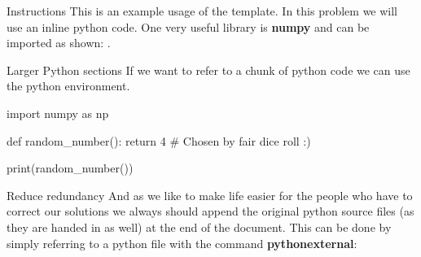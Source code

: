 \documentclass{dfki_ml}
\begin{document}
\begin{problem}{Instructions}
This is an example usage of the template. In this problem
we will use an inline python code. One very useful library
is \textbf{numpy} and can be imported as shown: .
\end{problem}


\begin{problem}{Larger Python sections}
If we want to refer to a chunk of python code we can use the python
environment.
\begin{python}
import numpy as np

def random_number():
    return 4 # Chosen by fair dice roll :)
    
print(random_number())
\end{python}
\end{problem}

\begin{problem}{Reduce redundancy}
And as we like to make life easier for the people who have to
correct our solutions we always should append the original python
source files (as they are handed in as well) at the end of the 
document. This can be done by simply referring to a python file
with the command \textbf{pythonexternal}:


\end{problem}
\end{document}
